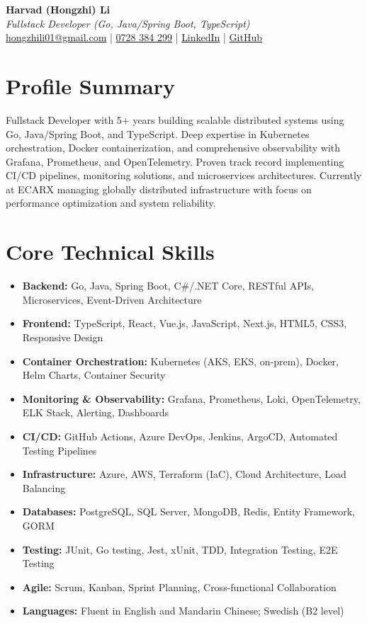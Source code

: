 \documentclass[10pt,a4paper]{article}
\begin{document}
\pagestyle{empty}

\begin{center}
{\LARGE \textbf{Harvad (Hongzhi) Li}}\\[8pt]
{\Large \textit{Fullstack Developer (Go, Java/Spring Boot, TypeScript)}}\\[8pt]
\textcolor{linkedinblue}{\href{mailto:hongzhili01@gmail.com}{hongzhili01@gmail.com} | \href{tel:0728384299}{0728 384 299} | \href{https://www.linkedin.com/in/harvad/}{LinkedIn} | \href{https://github.com/bluehawana}{GitHub}}
\end{center}
\vspace{8pt}

\section*{Profile Summary}
Fullstack Developer with 5+ years building scalable distributed systems using Go, Java/Spring Boot, and TypeScript. Deep expertise in Kubernetes orchestration, Docker containerization, and comprehensive observability with Grafana, Prometheus, and OpenTelemetry. Proven track record implementing CI/CD pipelines, monitoring solutions, and microservices architectures. Currently at ECARX managing globally distributed infrastructure with focus on performance optimization and system reliability.

\section*{Core Technical Skills}
\begin{itemize}[noitemsep]
\item \textbf{Backend:} Go, Java, Spring Boot, C\#/.NET Core, RESTful APIs, Microservices, Event-Driven Architecture
\item \textbf{Frontend:} TypeScript, React, Vue.js, JavaScript, Next.js, HTML5, CSS3, Responsive Design
\item \textbf{Container Orchestration:} Kubernetes (AKS, EKS, on-prem), Docker, Helm Charts, Container Security
\item \textbf{Monitoring \& Observability:} Grafana, Prometheus, Loki, OpenTelemetry, ELK Stack, Alerting, Dashboards
\item \textbf{CI/CD:} GitHub Actions, Azure DevOps, Jenkins, ArgoCD, Automated Testing Pipelines
\item \textbf{Infrastructure:} Azure, AWS, Terraform (IaC), Cloud Architecture, Load Balancing
\item \textbf{Databases:} PostgreSQL, SQL Server, MongoDB, Redis, Entity Framework, GORM
\item \textbf{Testing:} JUnit, Go testing, Jest, xUnit, TDD, Integration Testing, E2E Testing
\item \textbf{Agile:} Scrum, Kanban, Sprint Planning, Cross-functional Collaboration
\item \textbf{Languages:} Fluent in English and Mandarin Chinese; Swedish (B2 level)
\end{itemize}
\end{document}
